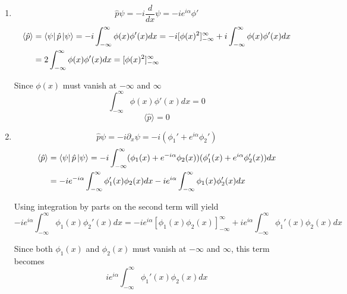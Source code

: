 \begin{sol}
\begin{enumerate}[label=\textbf{(\alph*)}]
  \item 
  \begin{equation}
    \hat{p}\psi=-i\frac{d}{dx}\psi=-ie^{i\alpha}\phi'
  \end{equation}
  \begin{equation}
    \begin{aligned}
      \langle\hat{p}\rangle&=\bra{\psi}\hat{p}\ket{\psi}=-i\int_{-\infty}^{\infty}\phi(x)\phi'(x)dx=-i[\phi(x)^2]_{-\infty}^{\infty}+i\int_{-\infty}^{\infty}\phi(x)\phi'(x)dx\\
      &=2\int_{-\infty}^{\infty}\phi(x)\phi'(x)dx=[\phi(x)^2]_{-\infty}^{\infty}
    \end{aligned}
  \end{equation}
      
  Since $\phi(x)$ must vanish at $-\infty$ and $\infty$
  \begin{equation}
    \int_{-\infty}^{\infty}\phi(x)\phi'(x)dx=0
  \end{equation}
  \begin{equation}
    \langle\hat{p}\rangle=0
  \end{equation}
    \item
    \begin{equation}
      \hat{p}\psi=-i\partial_x\psi=-i(\phi_1'+e^{i\alpha}\phi_2')
    \end{equation}
    \begin{equation}
      \begin{aligned}
        \langle\hat{p}\rangle&=\bra{\psi}\hat{p}\ket{\psi}=-i\int_{-\infty}^{\infty}(\phi_1 (x)+e^{-i\alpha}\phi_2(x))(\phi_1'(x)+e^{i\alpha}\phi_2'(x))dx\\
        &=-ie^{-i\alpha}\int_{-\infty}^{\infty}\phi_1'(x)\phi_2(x)dx-ie^{i\alpha}\int_{-\infty}^{\infty}\phi_1(x)\phi_2'(x)dx
      \end{aligned}
    \end{equation}

Using integration by parts on the second term will yield
\begin{equation}
  -ie^{i\alpha}\int_{-\infty}^{\infty}\phi_1(x)\phi_2'(x)dx=-ie^{i\alpha}[\phi_1(x)\phi_2(x)]_{-\infty}^{\infty}+ie^{i\alpha}\int_{-\infty}^{\infty}\phi_1'(x)\phi_2(x)dx
\end{equation}

Since both $\phi_1(x)$ and $\phi_2(x)$ must vanish at $-\infty$ and $\infty$, this term becomes 
\begin{equation}
  ie^{i\alpha}\int_{-\infty}^{\infty}\phi_1'(x)\phi_2(x)dx
\end{equation}


\end{enumerate}
\end{sol}
